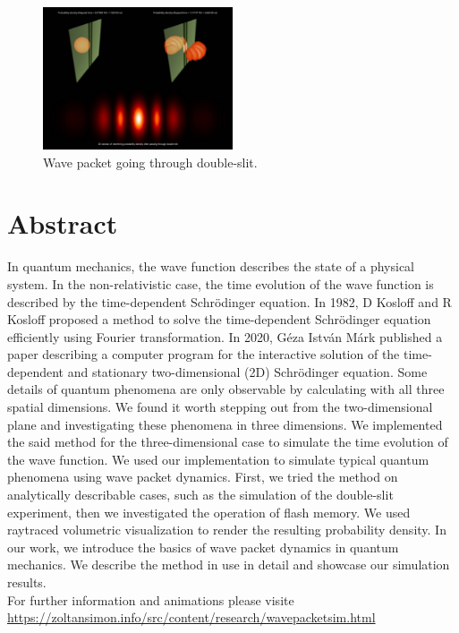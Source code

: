 \begin{figure}[H]
	\centering
	\includegraphics[width=0.5\textwidth]{"figures/preview_image.jpeg"}
	\caption{Wave packet going through double-slit.}
	\label{fig:penetrating_potential}
\end{figure}
\pagebreak

\section*{Abstract}

In quantum mechanics, the wave function describes the state of a physical system. In the non-relativistic case, the time evolution of the wave function is described by the time-dependent Schrödinger equation. In 1982, D Kosloff and R Kosloff proposed a method \cite{KOSLOFF198335} to solve the time-dependent Schrödinger equation efficiently using Fourier transformation. In 2020, Géza István Márk published a paper \cite{mark2020webschrodinger} describing a computer program for the interactive solution of the time-dependent and stationary two-dimensional (2D) Schrödinger equation. Some details of quantum phenomena are only observable by calculating with all three spatial dimensions. We found it worth stepping out from the two-dimensional plane and investigating these phenomena in three dimensions. We implemented the said method for the three-dimensional case to simulate the time evolution of the wave function. We used our implementation to simulate typical quantum phenomena using wave packet dynamics. First, we tried the method on analytically describable cases, such as the simulation of the double-slit experiment, then we investigated the operation of flash memory. We used raytraced volumetric visualization to render the resulting probability density. In our work, we introduce the basics of wave packet dynamics in quantum mechanics. We describe the method in use in detail and showcase our simulation results.\\
For further information and animations please visite\\ \url{https://zoltansimon.info/src/content/research/wavepacketsim.html}

